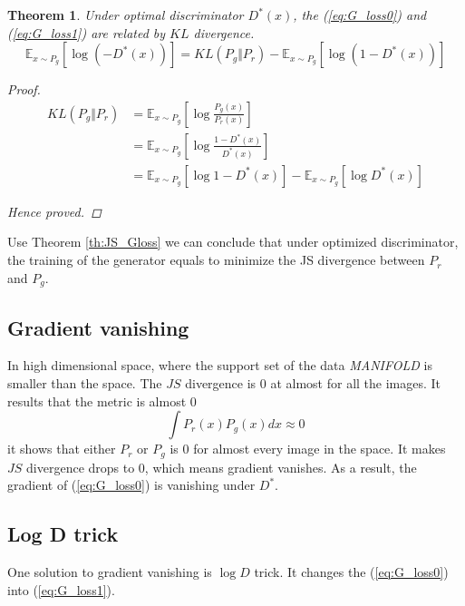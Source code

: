 \documentclass[a4paper]{article}
\newtheorem{theorem}{Theorem}[section]
\begin{document}
\begin{theorem} \label{th:KL_Gloss}
    Under optimal discriminator $D^*(x)$, the (\ref{eq:G_loss0}) and (\ref{eq:G_loss1}) are related by $KL$ divergence.
    \begin{equation*}
        \mathbb{E}_{x\sim P_g}[\log {(-D^*(x))}]
        = KL(P_g \Vert P_r)
        - \mathbb{E}_{x\sim P_g}[\log {(1-D^*(x))}]
    \end{equation*}

    \begin{proof}
        \begin{equation*}
            \begin{aligned}
                KL(P_g \Vert P_r) & = \mathbb{E}_{x\sim P_g}[\log {\frac{P_g(x)}{P_r(x)}}]   \\
                                  & = \mathbb{E}_{x\sim P_g}[\log {\frac{1-D^*(x)}{D^*(x)}}] \\
                                  & = \mathbb{E}_{x\sim P_g}[\log {1-D^*(x)}]
                - \mathbb{E}_{x\sim P_g}[\log {D^*(x)}]
            \end{aligned}
        \end{equation*}

        Hence proved.
    \end{proof}

\end{theorem}

Use Theorem \ref{th:JS_Gloss} we can conclude that under optimized discriminator, the training of the generator equals to minimize the JS divergence between $P_r$ and $P_g$.

\subsection{Gradient vanishing}
In high dimensional space, where the support set of the data \emph{MANIFOLD} is smaller than the space.
The $JS$ divergence is $0$ at almost for all the images.
It results that the metric is almost $0$
\begin{equation}
    \int P_r(x) P_g(x) dx \approx 0
\end{equation}
it shows that either $P_r$ or $P_g$ is $0$ for almost every image in the space.
It makes $JS$ divergence drops to $0$, which means gradient vanishes.
As a result, the gradient of (\ref{eq:G_loss0}) is vanishing under $D^*$.

\subsection{Log D trick}
One solution to gradient vanishing is $\log D$ trick.
It changes the (\ref{eq:G_loss0}) into (\ref{eq:G_loss1}).
\end{document}
